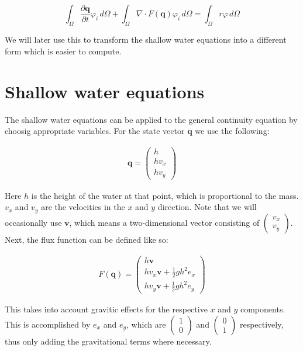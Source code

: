 \documentclass{article}
\newcommand{\pd}[2]{\dfrac{\partial #1}{\partial #2}}
\renewcommand{\phi}{\varphi}
\begin{document}
\begin{equation}
  \label{eq:general-continuity-equation-discontinuous-galerkin}
  \int_\Omega \pd{\mathbf{q}}{t} \phi_i \,d\Omega + \int_\Omega \nabla \cdot F(\mathbf{q}) \phi_i \,d\Omega = \int_\Omega r \phi \,d\Omega
\end{equation}

We will later use this to transform the shallow water equations into a different form which is easier to compute.

\section{Shallow water equations}
\label{sec:shallow-water-equations}

The shallow water equations can be applied to the general continuity equation by choosig appropriate variables. For the state vector $\mathbf{q}$ we use the following:

\begin{eqnarray*}
  \mathbf{q} =
  \begin{pmatrix}
    h \\ h v_x \\ h v_y
  \end{pmatrix}
\end{eqnarray*}

Here $h$ is the height of the water at that point, which is proportional to the mass. $v_x$ and $v_y$ are the velocities in the $x$ and $y$ direction. Note that we will occasionally use $\mathbf{v}$, which means a two-dimensional vector consisting of $\begin{pmatrix} v_x \\ v_y \end{pmatrix}$. Next, the flux function can be defined like so:

\begin{eqnarray*}
  F(\mathbf{q}) =
  \begin{pmatrix}
    h \mathbf{v} \\ h v_x \mathbf{v} + \frac{1}{2} g h^2 e_x \\ h v_y \mathbf{v} + \frac{1}{2} g h^2 e_y
  \end{pmatrix}
\end{eqnarray*}

This takes into account gravitic effects for the respective $x$ and $y$ components. This is accomplished by $e_x$ and $e_y$, which are $\begin{pmatrix} 1 \\ 0 \end{pmatrix}$ and $\begin{pmatrix} 0 \\ 1 \end{pmatrix}$ respectively, thus only adding the gravitational terms where necessary.
\end{document}
